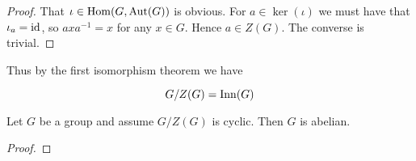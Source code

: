 \begin{proof}
	That $\iota \in \operatorname{Hom}(G,\operatorname{Aut}(G))$ is obvious. For $a \in \ker(\iota)$ we must have that $\iota_a = \operatorname{id}$, so $axa^{-1} = x$ for any $x \in G$. Hence $a \in Z(G)$. The converse is trivial.
\end{proof}

Thus by the first isomorphism theorem we have 

\begin{equation*}
	G/Z(G) = \operatorname{Inn}(G)
\end{equation*}

\begin{proposition}
	Let $G$ be a group and assume $G/Z(G)$ is cyclic. Then $G$ is abelian.
\end{proposition}

\begin{proof}
	
\end{proof}
